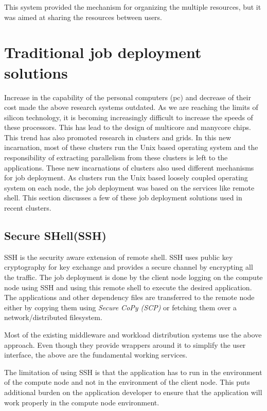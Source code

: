 This system provided the mechanism for organizing the multiple resources,
but it was aimed at sharing the resources between users.

\section{Traditional job deployment solutions}
Increase  in the capability of the personal computers (pc) and decrease of their
cost made the above research systems outdated.  As we are reaching the limits of
silicon technology, it is becoming increasingly difficult to increase the
speeds of these processors. This has lead to the design of multicore and
manycore chips.  This trend has also promoted research in clusters and grids. 
In this new incarnation, most of these clusters run the Unix based operating
system and the responsibility of extracting parallelism from these clusters
is left to the applications.  These new incarnations of clusters also used
different mechanisms for job deployment.  As clusters run the Unix based 
loosely coupled operating system on each node, the job deployment was based on
the services like remote shell.  This section discusses a few of these job
deployment solutions used in recent clusters.


\subsection{Secure SHell(SSH)}
SSH\cite{ssh} is the security aware extension of remote shell.  SSH uses public
key cryptography for key exchange and provides a secure channel by encrypting
all the traffic.  The job deployment is done by the client node logging on the
compute node using SSH and using this remote shell to execute the desired
application.  The applications and other dependency files are transferred to 
the remote node either by copying them using \textit{Secure CoPy (SCP)} or 
fetching them over a network/distributed filesystem.


Most of the existing middleware and workload distribution systems use the above
approach.  Even though they provide wrappers around it to simplify the user
interface, the above are the fundamental working services.


The limitation of using SSH is that the application has to run in the
environment of the compute node and not in the environment of the client node. 
This puts additional burden on the application developer to ensure that the
application will work properly in the compute node environment.


